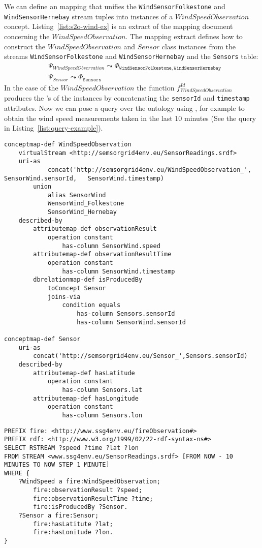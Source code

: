 \normalsize
We can define an \stwoo mapping that unifies the \texttt{WindSensorFolkestone} and \texttt{WindSensorHernebay} stream tuples into instances of a $WindSpeedObservation$ concept. 
Listing~\ref{list:s2o-wind-ex} is an extract of the \stwoo mapping document concerning the $WindSpeedObservation$.
The mapping extract defines how to construct the $WindSpeedObservation$ and $Sensor$ class instances from the streams \texttt{WindSensorFolkestone} and \texttt{WindSensorHernebay} and the \texttt{Sensors} table: 
\begin{align*}
& \Psi_{WindSpeedObservation}\leadsto \Phi_{\mathtt{WindSensorFolkestone,WindSensorHernebay}} \\ 
& \Psi_{Sensor}\leadsto \Phi_{\mathtt{Sensors}}
\end{align*} 
In the case of the $WindSpeedObservation$ the function $f_{WindSpeedObservation}^{Id}$ produces the \uri's of the instances by concatenating the \texttt{sensorId} and \texttt{timestamp} attributes.
Now we can pose a query over the ontology using \sparqlstr, for example to obtain the wind speed measurements taken in the last 10 minutes (See the query in Listing~\ref{list:query-example}).

\begin{lstlisting}[style=R2OStyle,language=R2O,frame=none,float,label=list:s2o-wind-ex,caption=\stwoo mapping from the data streams \texttt{WindSensorFolkestone} and \texttt{WindSensorHernebay} to the ontology concepts $WindSpeedObservation$.]
conceptmap-def WindSpeedObservation
	virtualStream <http://semsorgrid4env.eu/SensorReadings.srdf>
	uri-as
			concat('http://semsorgrid4env.eu/WindSpeedObservation_', SensorWind.sensorId, 	SensorWind.timestamp)
		union 
			alias SensorWind
			WensorWind_Folkestone
			SensorWind_Hernebay
	described-by
		attributemap-def observationResult
			operation constant
				has-column SensorWind.speed
		attributemap-def observationResultTime
			operation constant
				has-column SensorWind.timestamp
		dbrelationmap-def isProducedBy
			toConcept Sensor
			joins-via
				condition equals
					has-column Sensors.sensorId
					has-column SensorWind.sensorId

conceptmap-def Sensor
	uri-as
		concat('http://semsorgrid4env.eu/Sensor_',Sensors.sensorId)
	described-by
		attributemap-def hasLatitude
			operation constant
				has-column Sensors.lat
		attributemap-def hasLongitude
			operation constant
				has-column Sensors.lon
\end{lstlisting}


\begin{lstlisting}[style=SPARQLSTRStyle,language=SPARQLSTR,frame=none,float,label=
list:query-example,caption=\sparqlstr query which every minute returns the wind speed for the last ten minutes.]
PREFIX fire: <http://www.ssg4env.eu/fireObservation#>
PREFIX rdf: <http://www.w3.org/1999/02/22-rdf-syntax-ns#>
SELECT RSTREAM ?speed ?time ?lat ?lon
FROM STREAM <www.ssg4env.eu/SensorReadings.srdf> [FROM NOW - 10 MINUTES TO NOW STEP 1 MINUTE]
WHERE {
	?WindSpeed a fire:WindSpeedObservation;
		fire:observationResult ?speed;
		fire:observationResultTime ?time;
		fire:isProducedBy ?Sensor.
  	?Sensor a fire:Sensor; 
		fire:hasLatitute ?lat;
		fire:hasLonitude ?lon.
}
\end{lstlisting}


